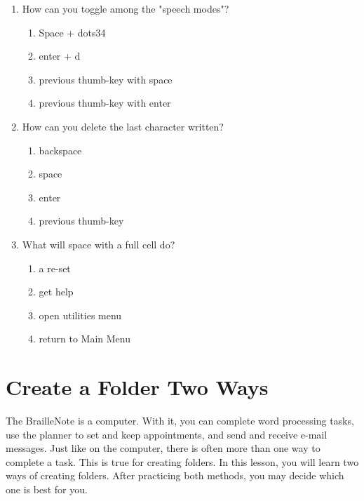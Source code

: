 \documentclass[10pt,letterpaper,twoside]{report}
\begin{document}
{\begin{enumerate}
\begin{enumerate}
			      \item backspace
		      \end{enumerate}
		\item How can you toggle among the "speech modes"?
		      \begin{enumerate}
			      \item Space + dots34
			      \item enter + d
			      \item previous thumb-key with space
			      \item previous thumb-key with enter
		      \end{enumerate}
		\item How can you delete the last character written?
		      \begin{enumerate}
			      \item backspace
			      \item space
			      \item enter
			      \item previous thumb-key
		      \end{enumerate}
		\item What will space with a full cell do?
		      \begin{enumerate}
			      \item a re-set
			      \item get help
			      \item open utilities menu
			      \item return to Main Menu
		      \end{enumerate}
	\end{enumerate} }
\clearpage 

\section*{Create a Folder Two Ways}
The BrailleNote is a computer. With it, you can complete word processing tasks, use the planner to set and keep appointments, and send and receive e-mail messages. Just like on the computer, there is often more than one way to complete a task. This is true for creating folders. In this lesson, you will learn two ways of creating folders. After practicing both methods, you may decide which one is best for you.
\end{document}
